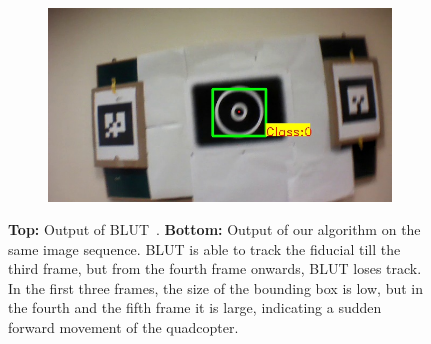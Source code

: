\begin{figure}[t!]
\begin{subfigure}[b]{.19\textwidth}
\end{subfigure}
\begin{subfigure}[b]{.19\textwidth}
\includegraphics[width=\linewidth]{figures/fiducial/BLUT_input_00/output6.jpg}
\end{subfigure}
\caption[Output of BLUT on ARTag and our fiducial with code
``00'']{\textbf{Top:} Output of BLUT~\cite{Wu:2011}.
\textbf{Bottom:} Output of our algorithm on the same image 
  sequence. BLUT is able to track the fiducial till the third frame,
  but from the fourth frame onwards, BLUT loses track. In the first
  three frames, the size of the  bounding box is low, but in the fourth
  and the fifth frame it is large, indicating a sudden forward movement
  of the quadcopter.} 
\label{fig:BLUT_compare_00}
\end{figure}

